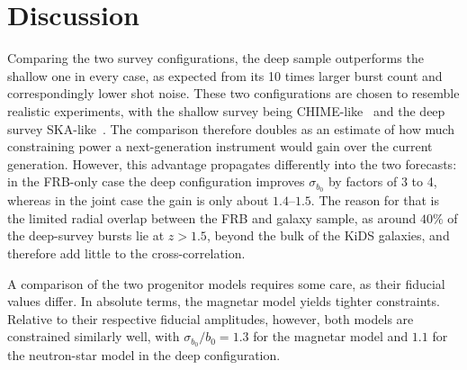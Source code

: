 \section{Discussion} \label{sec:results_discussion}

Comparing the two survey configurations, the deep sample outperforms the shallow one in every
case, as expected from its 10 times larger burst count and correspondingly lower shot noise.
These two configurations are chosen to resemble realistic experiments, with the shallow survey
being CHIME-like~\cite{CHIMEFRB2026} and the deep survey SKA-like~\cite{Hashimoto_2020}.
The comparison therefore doubles as an estimate of how much constraining power a next-generation
instrument would gain over the current generation.
However, this advantage propagates differently into the two forecasts: in the FRB-only case the
deep configuration improves $\sigma_{b_0}$ by factors of 3 to 4, whereas in the joint case the gain is only about
$1.4$--$1.5$. The reason for that is the limited radial overlap between the FRB and galaxy sample,
as around $40\%$ of the deep-survey bursts lie at $z > 1.5$, beyond the bulk of the KiDS galaxies, and therefore
add little to the cross-correlation.

A comparison of the two progenitor models requires some care, as their fiducial values differ.
In absolute terms, the magnetar model yields tighter constraints. Relative to their respective 
fiducial amplitudes, however, both models are constrained similarly well, 
with $\sigma_{b_0}/b_0 = 1.3$ for the magnetar model and $1.1$ for the neutron-star 
model in the deep configuration.

